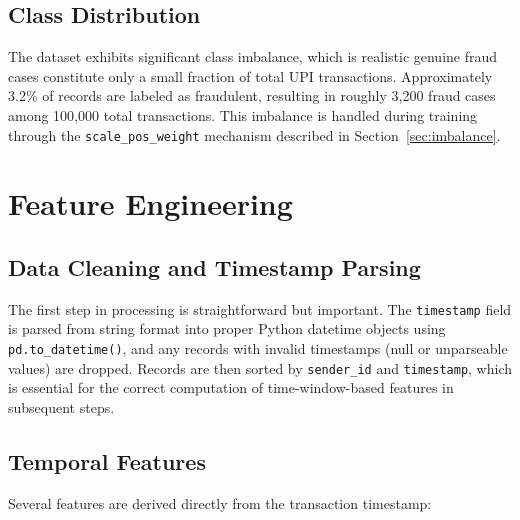 \subsection{Class Distribution}

The dataset exhibits significant class imbalance, which is realistic genuine fraud cases constitute only a small fraction of total UPI transactions. Approximately 3.2\% of records are labeled as fraudulent, resulting in roughly 3,200 fraud cases among 100,000 total transactions. This imbalance is handled during training through the \texttt{scale\_pos\_weight} mechanism described in Section~\ref{sec:imbalance}.

\section{Feature Engineering}

\subsection{Data Cleaning and Timestamp Parsing}

The first step in processing is straightforward but important. The \texttt{timestamp} field is parsed from string format into proper Python datetime objects using \texttt{pd.to\_datetime()}, and any records with invalid timestamps (null or unparseable values) are dropped. Records are then sorted by \texttt{sender\_id} and \texttt{timestamp}, which is essential for the correct computation of time-window-based features in subsequent steps.

\subsection{Temporal Features}

Several features are derived directly from the transaction timestamp:


